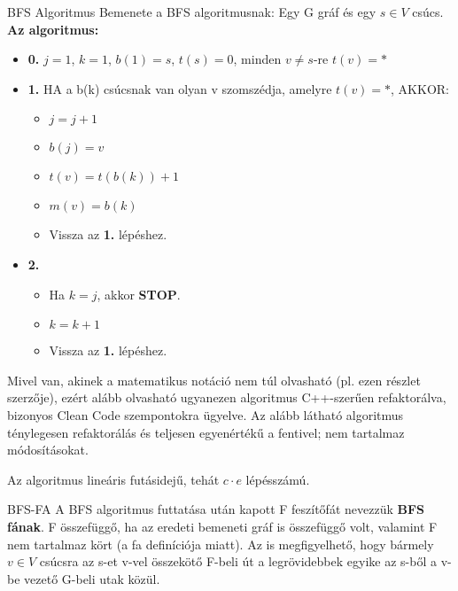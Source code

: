 \begin{tetel}{BFS Algoritmus}
Bemenete a BFS algoritmusnak: Egy G gráf és egy $s \in V$ csúcs.
\\
\textbf{Az algoritmus:}
\begin{itemize}
\item{\textbf{0.}} $j = 1$, $k = 1$, $b(1) = s$, $t(s) = 0$, minden $v \neq s$-re $t(v) = *$
\item{\textbf{1.}} HA a b(k) csúcsnak van olyan v szomszédja, amelyre $t(v) = *$, AKKOR:
	\begin{itemize}
	\item $j = j + 1$
	\item $b(j) = v$
	\item $t(v) = t(b(k)) + 1$
	\item $m(v) = b(k)$
	\item Vissza az \textbf{1.} lépéshez.
	\end{itemize}
\item{\textbf{2.}}
	\begin{itemize}
	\item Ha $k = j$, akkor \textbf{STOP}.
	\item $k = k + 1$
	\item Vissza az \textbf{1.} lépéshez.
	\end{itemize}
\end{itemize}

Mivel van, akinek a matematikus notáció nem túl olvasható (pl. ezen részlet szerzője), ezért alább olvasható ugyanezen algoritmus C++-szerűen refaktorálva, bizonyos Clean Code szempontokra ügyelve. Az alább látható algoritmus ténylegesen refaktorálás és teljesen egyenértékű a fentivel; nem tartalmaz módosításokat.



Az algoritmus lineáris futásidejű, tehát $c \cdot e$ lépésszámú.

\end{tetel}

\begin{definicio}{BFS-FA}
A BFS algoritmus futtatása után kapott F feszítőfát nevezzük \textbf{BFS fának}. F összefüggő, ha az eredeti bemeneti gráf is összefüggő volt, valamint F nem tartalmaz kört (a fa definíciója miatt). Az is megfigyelhető, hogy bármely $v \in V$ csúcsra az s-et v-vel összekötő F-beli út a legrövidebbek egyike az s-ből a v-be vezető G-beli utak közül.
\end{definicio}

